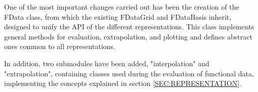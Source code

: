 One of the most important changes carried out has been the creation of the
FData class, from which the existing FDataGrid and FDataBasis inherit,
designed to unify the API of the different representations. This class
implements general methods for evaluation, extrapolation, and plotting and
defines abstract ones common to all representations.

In addition, two submodules have been added,
"interpolation" and "extrapolation", containing classes used during the
evaluation of functional data, implementing the concepts explained
in section \ref{SEC:REPRESENTATION}.
